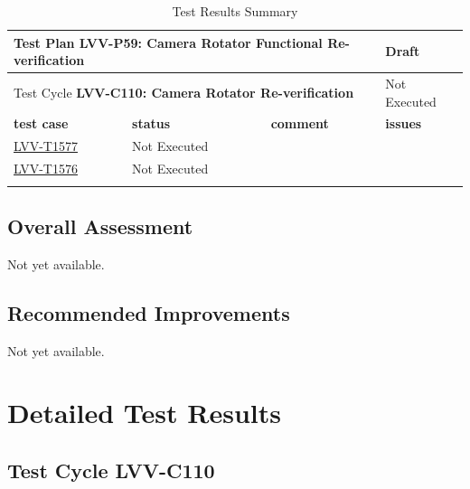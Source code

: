 \documentclass[SE,lsstdraft,STR,toc]{lsstdoc}
\begin{document}
\begin{longtable}{p{2.5cm}p{3cm}p{7.5cm}p{3cm}}
\toprule
\multicolumn{3}{l}{ Test Plan {\bf LVV-P59: Camera Rotator Functional Re-verification
 }} & Draft \\\hline

  \multicolumn{3}{l}{ Test Cycle {\bf LVV-C110: Camera Rotator Re-verification
 }} & Not Executed \\\hline

  {\bf \footnotesize test case} & {\bf \footnotesize status} & {\bf \footnotesize comment} & {\bf \footnotesize issues} \\\toprule

    \href{https://jira.lsstcorp.org/secure/Tests.jspa#/testCase/LVV-T1577}{LVV-T1577}
    & Not Executed &
    \begin{minipage}[]{9cm}
    \smallskip
    
    \medskip
    \end{minipage}
    &
    \\\hline
    \href{https://jira.lsstcorp.org/secure/Tests.jspa#/testCase/LVV-T1576}{LVV-T1576}
    & Not Executed &
    \begin{minipage}[]{9cm}
    \smallskip
    
    \medskip
    \end{minipage}
    &
    \\\hline
\caption{Test Results Summary}
\label{table:summary}
\end{longtable}

\subsection{Overall Assessment}
\label{sect:overallassessment}

Not yet available.

\subsection{Recommended Improvements}
\label{sect:recommendations}

Not yet available.

\newpage
\section{Detailed Test Results}
\label{sect:detailedtestresults}

\subsection{Test Cycle LVV-C110 }
\end{document}

